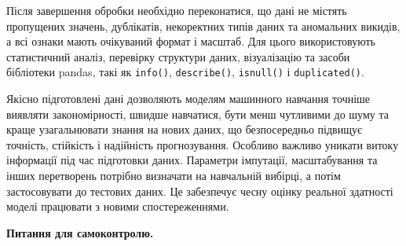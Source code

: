  Після завершення обробки необхідно переконатися, що дані не містять пропущених значень, 
дублікатів, некоректних типів даних та аномальних викидів, а всі ознаки мають очікуваний формат 
і масштаб. Для цього використовують статистичний аналіз, перевірку структури даних, візуалізацію 
та засоби бібліотеки pandas, такі як \verb|info()|, \verb|describe()|, \verb|isnull()| і 
\verb|duplicated()|. 

 Якісно підготовлені дані дозволяють моделям машинного навчання точніше виявляти закономірності, 
швидше навчатися, бути менш чутливими до шуму та краще узагальнювати знання на нових даних, що 
безпосередньо підвищує точність, стійкість і надійність прогнозування. Особливо важливо уникати витоку інформації під час підготовки даних. Параметри імпутації, масштабування та інших перетворень потрібно визначати на навчальній вибірці, а потім застосовувати до тестових даних. Це забезпечує чесну оцінку реальної здатності моделі працювати з новими спостереженнями.

\medskip
{} \textbf{Питання для самоконтролю.}


